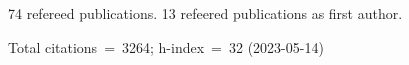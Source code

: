 74 refereed publications. 13 refeered publications as first author.

Total citations~=~3264; h-index~=~32 (2023-05-14)